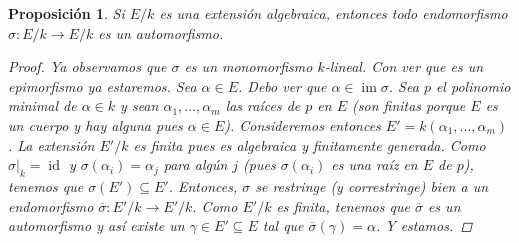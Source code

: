 \documentclass[12pt]{book}
\newtheorem{prop}[teo]{Proposición}
\theoremstyle{definition}
\DeclareMathOperator{\id}{id}
\DeclareMathOperator{\im}{im}
\begin{document}
\begin{prop}
Si $E/k$ es una extensión algebraica, entonces todo endomorfismo $\sigma:E/k\to E/k$ es un automorfismo.
\begin{proof}
Ya observamos que $\sigma$ es un monomorfismo $k$-lineal. Con ver que es un epimorfismo ya estaremos. Sea $\alpha\in E$. Debo ver que $\alpha\in\im \sigma$. Sea $p$ el polinomio minimal de $\alpha\in k$ y sean $\alpha_1,\ldots ,\alpha_m$ las raíces de $p$ en $E$ (son finitas porque $E$ es un cuerpo y hay alguna pues $\alpha\in E$). Consideremos entonces $E'=k(\alpha_1,\ldots, \alpha_m)$. La extensión $E'/k$ es finita pues es algebraica y finitamente generada. Como $\left.\sigma\right|_{k}=\id$ y $\sigma(\alpha_i)=\alpha_j$ para algún $j$ (pues $\sigma(\alpha_i)$ es una raíz en $E$ de $p$), tenemos que $\sigma(E')\subseteq E'$. Entonces, $\sigma$ se restringe (y correstringe) bien a un endomorfismo $\overline{\sigma}:E'/k\to E'/k$. Como $E'/k$ es finita, tenemos que $\overline{\sigma}$ es un automorfismo y así existe un $\gamma\in E'\subseteq E$ tal que $\overline{\sigma}(\gamma) = \alpha$. Y estamos.
\end{proof}
\end{prop}
\end{document}
